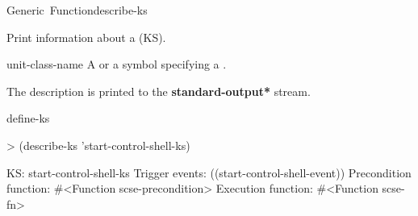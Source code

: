 \documentclass[10pt,twoside,english,pdftex]{article}
\begin{document}

\begin{functiondoc}{Generic~Function}{describe-ks}%
  {}
%
%

\fnsyntax

\fnpurpose
Print information about a  (KS).
 
\fnmethods
{}

\fnpackage {}

\fnmodule {}

\fnargs
\begin{args}{unit-class-name}
   A  or a symbol specifying a
  .
\end{args}

\fndescription
{}%
The description is printed to the {\bf *standard-output*} stream.

\begin{alsos}{define-ks}
\also[define-ks]
\also[ks]
\end{alsos}

\fnexample
\begin{example}
> (describe-ks 'start-control-shell-ks)

KS: start-control-shell-ks
  Trigger events:        ((start-control-shell-event))
  Precondition function: #<Function scse-precondition>
  Execution function:    #<Function scse-fn>
\end{example}

\end{functiondoc}

\end{document}
